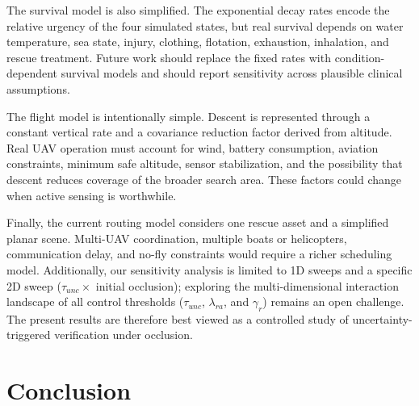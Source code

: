 \documentclass[runningheads]{llncs}
\begin{document}
The survival model is also simplified. The exponential decay rates encode the relative urgency of the four simulated states, but real survival depends on water temperature, sea state, injury, clothing, flotation, exhaustion, inhalation, and rescue treatment. Future work should replace the fixed rates with condition-dependent survival models and should report sensitivity across plausible clinical assumptions.

The flight model is intentionally simple. Descent is represented through a constant vertical rate and a covariance reduction factor derived from altitude. Real UAV operation must account for wind, battery consumption, aviation constraints, minimum safe altitude, sensor stabilization, and the possibility that descent reduces coverage of the broader search area. These factors could change when active sensing is worthwhile.

Finally, the current routing model considers one rescue asset and a simplified planar scene. Multi-UAV coordination, multiple boats or helicopters, communication delay, and no-fly constraints would require a richer scheduling model. Additionally, our sensitivity analysis is limited to 1D sweeps and a specific 2D sweep ($\tau_{unc} \times$ initial occlusion); exploring the multi-dimensional interaction landscape of all control thresholds ($\tau_{unc}$, $\lambda_{ra}$, and $\gamma_r$) remains an open challenge. The present results are therefore best viewed as a controlled study of uncertainty-triggered verification under occlusion.

\section{Conclusion}
\end{document}
